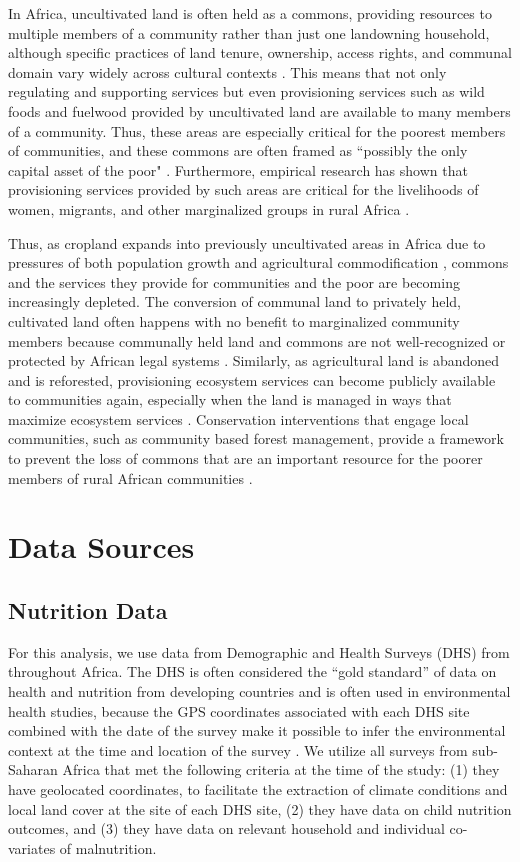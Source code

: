 \documentclass{article}
\begin{document}
In Africa, uncultivated land is often held as a commons, providing resources to multiple members of a community rather than just one landowning household, although specific practices of land tenure, ownership, access rights, and communal domain vary widely across cultural contexts \cite{Wily2008}.  This means that not only regulating and supporting services but even provisioning services such as wild foods and fuelwood provided by uncultivated land are available to many members of a community.  Thus, these areas are especially critical for the poorest members of communities, and these commons are often framed as ``possibly the only capital asset of the poor" \cite{Wily2008}.  Furthermore, empirical research has shown that provisioning services provided by such areas are critical for the livelihoods of women, migrants, and other marginalized groups in rural Africa \cite{Coulibaly-Lingani2009, Pouliot2013}.

Thus, as cropland expands into previously uncultivated areas in Africa due to pressures of both population growth and agricultural commodification \cite{Rudel2013, Laurance2014}, commons and the services they provide for communities and the poor are becoming increasingly depleted.  The conversion of communal land to privately held, cultivated land often happens with no benefit to marginalized community members because communally held land and commons are not well-recognized or protected by African legal systems \cite{Wily2011}.  Similarly, as agricultural land is abandoned and is reforested, provisioning ecosystem services can become publicly available to communities again, especially when the land is managed in ways that maximize ecosystem services \cite{Laris2008, Eldridge2011, Venter2018}.  Conservation interventions that engage local communities, such as community based forest management, provide a framework to prevent the loss of commons that are an important resource for the poorer members of rural African communities \cite{bray2003mexico}.

\section{Data Sources}

\subsection{Nutrition Data}
For this analysis, we use data from Demographic and Health Surveys (DHS) from throughout Africa.  The DHS is often considered the ``gold standard'' of data on health and nutrition from developing countries and is often used in environmental health studies, because the GPS coordinates associated with each DHS site combined with the date of the survey make it possible to infer the environmental context at the time and location of the survey \cite{Brown2014, enenkel2020predict}.  We utilize all surveys from sub-Saharan Africa that met the following criteria at the time of the study: (1) they have geolocated coordinates, to facilitate the extraction of climate conditions and local land cover at the site of each DHS site, (2) they have data on child nutrition outcomes, and (3) they have data on relevant household and individual co-variates of malnutrition.
\end{document}
